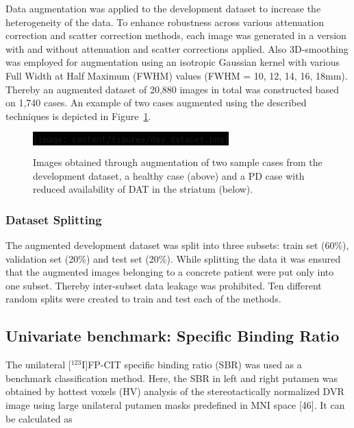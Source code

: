 Data augmentation was applied to the development dataset to increase the heterogeneity of the data.
To enhance robustness across various attenuation correction and scatter correction methods, 
each image was generated in a version with and without attenuation and scatter corrections applied.
Also 3D-smoothing was employed for augmentation using an isotropic Gaussian kernel with various 
Full Width at Half Maximum (FWHM) values (FWHM = 10, 12, 14, 16, 18mm).
Thereby an augmented dataset of 20,880 images in total was constructed based on 1,740 cases.
An example of two cases augmented using the described techniques is depicted in Figure~\ref{fig:dev_dataset}.

\begin{figure}[t]
    \centering
    \colorbox{black}{%
     \texttt{[image: content/figures/dev\_dataset.png]}%
     }
    \caption{Images obtained through augmentation of two sample cases from the development dataset, 
    a healthy case (above) and a PD case with reduced availability of DAT in the striatum (below).} 
    \label{fig:dev_dataset}
  \end{figure} 

\subsubsection{Dataset Splitting}
\label{subsec:split}

The augmented development dataset was split into three subsets: train set (60\%), validation set (20\%) 
and test set (20\%).
While splitting the data it was ensured that the augmented images belonging to a concrete patient were put 
only into one subset.
Thereby inter-subset data leakage was prohibited.
Ten different random splits were created to train and test each of the methods.

\subsection{Univariate benchmark: Specific Binding Ratio}
\label{subsec:sbr}


The unilateral [$^{123}$I]FP-CIT specific binding ratio (SBR) was used as a benchmark classification method.
Here, the SBR in left and right putamen was obtained by hottest voxels (HV) analysis of the stereotactically normalized 
DVR image using large unilateral putamen masks predefined in MNI space [46].
It can be calculated as 

